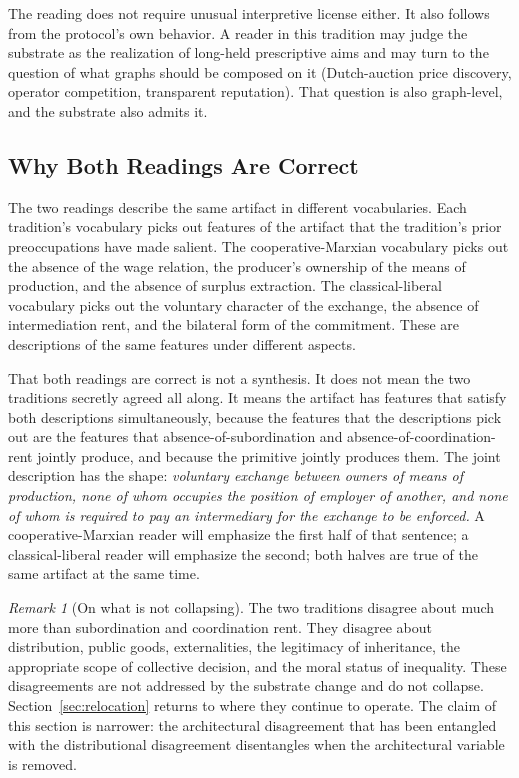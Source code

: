 \documentclass[11pt,a4paper]{article}
\theoremstyle{remark}
\newtheorem{remark}{Remark}[section]
\begin{document}
The reading does not require unusual interpretive license either.
It also follows from the protocol's own behavior. A reader in
this tradition may judge the substrate as the realization of
long-held prescriptive aims and may turn to the question of what
graphs should be composed on it (Dutch-auction price discovery,
operator competition, transparent reputation). That question is
also graph-level, and the substrate also admits it.

\subsection{Why Both Readings Are Correct}
\label{sec:both-correct}

The two readings describe the same artifact in different
vocabularies. Each tradition's vocabulary picks out features of
the artifact that the tradition's prior preoccupations have made
salient. The cooperative-Marxian vocabulary picks out the absence
of the wage relation, the producer's ownership of the means of
production, and the absence of surplus extraction. The
classical-liberal vocabulary picks out the voluntary character of
the exchange, the absence of intermediation rent, and the bilateral
form of the commitment. These are descriptions of the same
features under different aspects.

That both readings are correct is not a synthesis. It does not
mean the two traditions secretly agreed all along. It means the
artifact has features that satisfy both descriptions
simultaneously, because the features that the descriptions pick
out are the features that absence-of-subordination and
absence-of-coordination-rent jointly produce, and because the
primitive jointly produces them. The joint description has the
shape: \emph{voluntary exchange between owners of means of
production, none of whom occupies the position of employer of
another, and none of whom is required to pay an intermediary for
the exchange to be enforced.} A cooperative-Marxian reader will
emphasize the first half of that sentence; a classical-liberal
reader will emphasize the second; both halves are true of the
same artifact at the same time.

\begin{remark}[On what is not collapsing]
The two traditions disagree about much more than subordination
and coordination rent. They disagree about distribution, public
goods, externalities, the legitimacy of inheritance, the
appropriate scope of collective decision, and the moral status of
inequality. These disagreements are not addressed by the
substrate change and do not collapse. Section~\ref{sec:relocation}
returns to where they continue to operate. The claim of this
section is narrower: the architectural disagreement that has
been entangled with the distributional disagreement disentangles
when the architectural variable is removed.
\end{remark}
\end{document}
